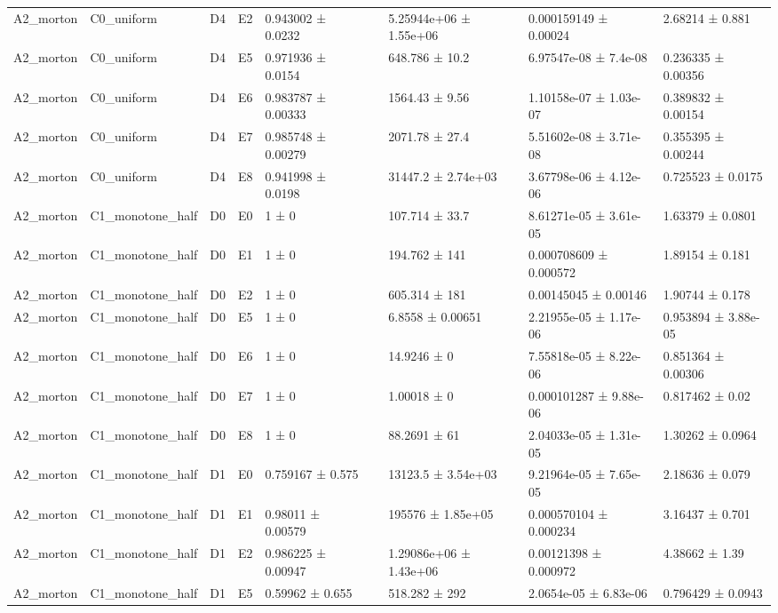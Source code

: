 \begin{table}
\begin{tabular}{lllllllll}
A2\_morton & C0\_uniform & D4 & E2 & 0.943002 ± 0.0232 &  & 5.25944e+06 ± 1.55e+06 & 0.000159149 ± 0.00024 & 2.68214 ± 0.881 \\
A2\_morton & C0\_uniform & D4 & E5 & 0.971936 ± 0.0154 &  & 648.786 ± 10.2 & 6.97547e-08 ± 7.4e-08 & 0.236335 ± 0.00356 \\
A2\_morton & C0\_uniform & D4 & E6 & 0.983787 ± 0.00333 &  & 1564.43 ± 9.56 & 1.10158e-07 ± 1.03e-07 & 0.389832 ± 0.00154 \\
A2\_morton & C0\_uniform & D4 & E7 & 0.985748 ± 0.00279 &  & 2071.78 ± 27.4 & 5.51602e-08 ± 3.71e-08 & 0.355395 ± 0.00244 \\
A2\_morton & C0\_uniform & D4 & E8 & 0.941998 ± 0.0198 &  & 31447.2 ± 2.74e+03 & 3.67798e-06 ± 4.12e-06 & 0.725523 ± 0.0175 \\
A2\_morton & C1\_monotone\_half & D0 & E0 & 1 ± 0 &  & 107.714 ± 33.7 & 8.61271e-05 ± 3.61e-05 & 1.63379 ± 0.0801 \\
A2\_morton & C1\_monotone\_half & D0 & E1 & 1 ± 0 &  & 194.762 ± 141 & 0.000708609 ± 0.000572 & 1.89154 ± 0.181 \\
A2\_morton & C1\_monotone\_half & D0 & E2 & 1 ± 0 &  & 605.314 ± 181 & 0.00145045 ± 0.00146 & 1.90744 ± 0.178 \\
A2\_morton & C1\_monotone\_half & D0 & E5 & 1 ± 0 &  & 6.8558 ± 0.00651 & 2.21955e-05 ± 1.17e-06 & 0.953894 ± 3.88e-05 \\
A2\_morton & C1\_monotone\_half & D0 & E6 & 1 ± 0 &  & 14.9246 ± 0 & 7.55818e-05 ± 8.22e-06 & 0.851364 ± 0.00306 \\
A2\_morton & C1\_monotone\_half & D0 & E7 & 1 ± 0 &  & 1.00018 ± 0 & 0.000101287 ± 9.88e-06 & 0.817462 ± 0.02 \\
A2\_morton & C1\_monotone\_half & D0 & E8 & 1 ± 0 &  & 88.2691 ± 61 & 2.04033e-05 ± 1.31e-05 & 1.30262 ± 0.0964 \\
A2\_morton & C1\_monotone\_half & D1 & E0 & 0.759167 ± 0.575 &  & 13123.5 ± 3.54e+03 & 9.21964e-05 ± 7.65e-05 & 2.18636 ± 0.079 \\
A2\_morton & C1\_monotone\_half & D1 & E1 & 0.98011 ± 0.00579 &  & 195576 ± 1.85e+05 & 0.000570104 ± 0.000234 & 3.16437 ± 0.701 \\
A2\_morton & C1\_monotone\_half & D1 & E2 & 0.986225 ± 0.00947 &  & 1.29086e+06 ± 1.43e+06 & 0.00121398 ± 0.000972 & 4.38662 ± 1.39 \\
A2\_morton & C1\_monotone\_half & D1 & E5 & 0.59962 ± 0.655 &  & 518.282 ± 292 & 2.0654e-05 ± 6.83e-06 & 0.796429 ± 0.0943 \\

\end{tabular}
\end{table}

